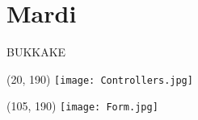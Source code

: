 \chapter{Mardi}

BUKKAKE

\begin{textblock}{0}(20, 190)
	\texttt{[image: Controllers.jpg]}
\end{textblock}

\begin{textblock}{0}(105, 190)
	\texttt{[image: Form.jpg]}
\end{textblock}